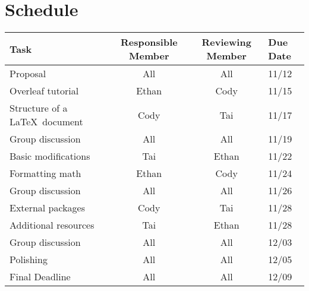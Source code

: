 \documentclass{article}
\begin{document}
\section{Schedule}
\begin{center}
\begin{tabular}{l c c l}
  Task & Responsible Member & Reviewing Member & Due Date \\
  \hline
  Proposal & All & All & 11/12 \\
  Overleaf tutorial & Ethan & Cody & 11/15\\
  Structure of a \LaTeX\ document & Cody & Tai & 11/17 \\
  Group discussion & All & All & 11/19 \\
  Basic modifications & Tai & Ethan & 11/22 \\
  Formatting math & Ethan & Cody & 11/24 \\
  Group discussion & All & All & 11/26 \\
  External packages & Cody & Tai & 11/28 \\
  Additional resources & Tai & Ethan & 11/28 \\
  Group discussion & All & All & 12/03 \\
  Polishing & All & All & 12/05 \\
  Final Deadline & All & All & 12/09
\end{tabular}
\end{center}
\end{document}
